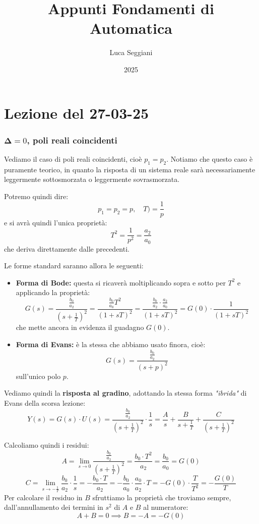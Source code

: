 \documentclass[a4paper,11pt]{article}
\title{Appunti Fondamenti di Automatica}
\author{Luca Seggiani}
\date{2025}
\begin{document}
\section{Lezione del 27-03-25}

\thispagestyle{empty}
\pagestyle{fancy}

\subsubsection{$\mathbf \Delta = 0$, poli reali coincidenti}
Vediamo il caso di poli reali coincidenti, cioè $p_1 = p_2$.
Notiamo che questo caso è puramente teorico, in quanto la risposta di un sistema reale sarà necessariamente leggermente sottosmorzata o leggermente sovrasmorzata.

Potremo quindi dire:
$$
p_1 = p_2 = p, \quad T )= \frac{1}{p}
$$
e si avrà quindi l'unica proprietà:
$$
T^2 = \frac{1}{p^2} = \frac{a_2}{a_0}
$$
che deriva direttamente dalle precedenti.

Le forme standard saranno allora le seguenti:
\begin{itemize}
	\item \textbf{Forma di Bode:} questa si ricaverà moltiplicando sopra e sotto per $T^2$ e applicando la proprietà:
$$
G(s) = \frac{ \frac{b_0}{a_2} }{(s + \frac{1}{T})^2} = \frac{ \frac{b_0}{a_0} T^2 }{(1 + s T)^2} = \frac{ \frac{b_0}{a_2} \cdot \frac{a_2}{a_0} }{(1 + sT)^2} = G(0) \cdot \frac{1}{(1 + sT)^2}  
$$
che mette ancora in evidenza il guadagno $G(0)$.
	\item \textbf{Forma di Evans:} è la stessa che abbiamo usato finora, cioè:
$$
G(s) = \frac{ \frac{b_0}{a_2} }{ (s + p)^2 }
$$
sull'unico polo $p$.
\end{itemize}

Vediamo quindi la \textbf{risposta al gradino}, adottando la stessa forma \textit{"ibrida"} di Evans della scorsa lezione:
$$
Y(s) = G(s) \cdot U(s) = \frac{ \frac{b_0}{a_2} }{ \left( s + \frac{1}{T} \right)^2 } \cdot \frac{1}{s} = \frac{A}{s} + \frac{B}{s + \frac{1}{T}} + \frac{C}{\left( s + \frac{1}{T} \right)^2}
$$

Calcoliamo quindi i residui:
$$
A = \lim_{s \rightarrow 0} \frac{ \frac{b_0}{a_2} }{ \left( s + \frac{1}{T} \right)^2 } = \frac{b_0 \cdot T^2}{a_2} = \frac{b_0}{a_0} = G(0)
$$
$$
C = \lim_{s \rightarrow - \frac{1}{T}} \frac{b_0}{a_2} \cdot \frac{1}{s} = - \frac{b_0 \cdot T}{a_2} = - \frac{b_0}{a_0} \cdot \frac{a_0}{a_2} \cdot T = - G(0) \cdot \frac{T}{T^2} = -\frac{G(0)}{T}
$$
Per calcolare il residuo in $B$ sfruttiamo la proprietà che troviamo sempre, dall'annullamento dei termini in $s^2$ di $A$ e $B$ al numeratore:
$$
A + B = 0 \implies B = -A = -G(0)
$$
\end{document}
